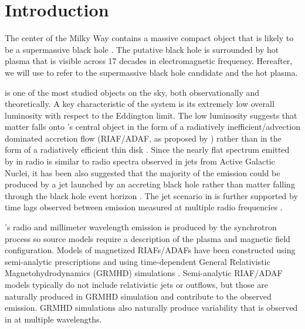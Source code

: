 \section{Introduction}
\label{sec:intro}

The center of the Milky Way contains a massive compact object that is likely to be a supermassive black hole \citep{2019Sci...365..664D, 2019A&A...625L..10G}.
The putative black hole is surrounded by hot plasma that is visible across 17 decades in electromagnetic frequency.
Hereafter, we will use \sgra to refer to the supermassive black hole candidate and the hot plasma.

\sgra is one of the most studied objects on the sky, both observationally and theoretically.  A key  characteristic of the \sgra system is its extremely low overall luminosity with respect to the Eddington limit.
The low luminosity suggests that matter falls onto \sgra's central object in the form of a radiatively inefficient/advection dominated accretion flow (RIAF/ADAF, as proposed by \citealt{1977ApJ...214..840I,1994ApJ...428L..13N, 1995ApJ...444..231N, 1995ApJ...452..710N, 1996A&AS..120C.287N, 1998ApJ...492..554N,2014ARA&A..52..529Y}) rather than in the form of a radiatively efficient thin disk \citep{1973A&A....24..337S}.
Since the nearly flat spectrum emitted by \sgra in radio is similar to radio spectra observed in jets from Active Galactic Nuclei, it has been also suggested that the majority of the \sgra emission could be produced by a jet launched by an accreting black hole rather than matter falling through the black hole event horizon \citep{1993A&A...278L...1F, 2000A&A...362..113F}.
The jet scenario in \sgra is further supported by time lags observed between emission measured at multiple radio frequencies \citep{2021arXiv210713402B}.

\sgra's radio and millimeter wavelength emission is produced by the  synchrotron process so source models require a description of the plasma and magnetic field configuration.  Models of magnetized RIAFs/ADAFs have been constructed using semi-analytic prescriptions \citep[e.g.,][]{1995Natur.374..623N,2000ApJ...541..234O, 2009ApJ...697...45B,2011ApJ...735..110B} and using time-dependent General Relativistic Magnetohydrodynamics (GRMHD) simulations \citep[e.g.,][]{2000ApJ...528..462H, 2003ApJ...589..458D, 2003ApJ...589..444G, 2007CQGra..24S.235G, 2012ApJS..201....9F, 2014ApJ...796...22F, 2016ApJS..225...22W, 2017ApJS..231...17A, 2018JPhCS1031a2008O, Olivares2019, 2019ApJS..243...26P}.
Semi-analytic RIAF/ADAF models typically do not include relativistic jets or outflows, but those are naturally produced in GRMHD simulation and contribute to the observed emission. GRMHD simulations also naturally produce variability that is observed in \sgra at multiple wavelengths.

